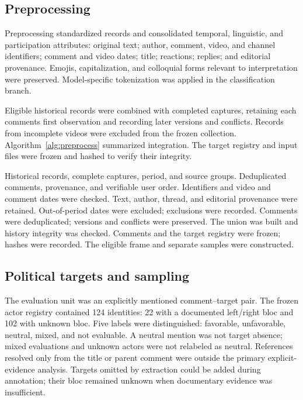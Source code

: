 \documentclass[conference, letterpaper]{IEEEtran}
\begin{document}
\subsection{Preprocessing}
Preprocessing standardized records and consolidated temporal, linguistic, and participation attributes: original text; author, comment, video, and channel identifiers; comment and video dates; title; reactions; replies; and editorial provenance. Emojis, capitalization, and colloquial forms relevant to interpretation were preserved. Model-specific tokenization was applied in the classification branch.

Eligible historical records were combined with completed captures, retaining each comment\textquotesingle s first observation and recording later versions and conflicts. Records from incomplete videos were excluded from the frozen collection. Algorithm~\ref{alg:preprocess} summarized integration. The target registry and input files were frozen and hashed to verify their integrity.

\begin{algorithm}[t]
\caption{Comment preprocessing and integration}
\label{alg:preprocess}
\begin{algorithmic}[1]
\Require Historical records, complete captures, period, and source groups.
\Ensure Deduplicated comments, provenance, and verifiable user order.
\State Identifiers and video and comment dates were checked.
\State Text, author, thread, and editorial provenance were retained.
\State Out-of-period dates were excluded; exclusions were recorded.
\State Comments were deduplicated; versions and conflicts were preserved.
\EndFor
\State The union was built and history integrity was checked.
\State Comments and the target registry were frozen; hashes were recorded.
\State The eligible frame and separate samples were constructed.
\end{algorithmic}
\end{algorithm}

\subsection{Political targets and sampling}
The evaluation unit was an explicitly mentioned comment--target pair. The frozen actor registry contained 124 identities: 22 with a documented left/right bloc and 102 with unknown bloc. Five labels were distinguished: favorable, unfavorable, neutral, mixed, and not evaluable. A neutral mention was not target absence; mixed evaluations and unknown actors were not relabeled as neutral. References resolved only from the title or parent comment were outside the primary explicit-evidence analysis. Targets omitted by extraction could be added during annotation; their bloc remained unknown when documentary evidence was insufficient.
\end{document}
